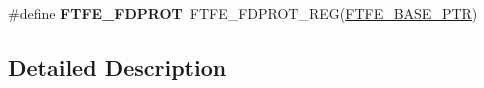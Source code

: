 \begin{DoxyCompactItemize}
\item 
\hypertarget{group___f_t_f_e___register___accessor___macros_ga4ad786f1feef89b2e849ffe41a249bad}{}\#define {\bfseries F\+T\+F\+E\+\_\+\+F\+D\+P\+R\+O\+T}~F\+T\+F\+E\+\_\+\+F\+D\+P\+R\+O\+T\+\_\+\+R\+E\+G(\hyperlink{group___f_t_f_e___peripheral_ga459f4097b9fd3f09e7bf790c17831f83}{F\+T\+F\+E\+\_\+\+B\+A\+S\+E\+\_\+\+P\+T\+R})\label{group___f_t_f_e___register___accessor___macros_ga4ad786f1feef89b2e849ffe41a249bad}

\end{DoxyCompactItemize}


\subsection{Detailed Description}
